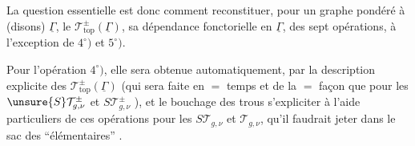 
La question essentielle est donc comment reconstituer, pour un graphe \deleted{$\unsure{\Gamma}$} pondéré à
  (disons) $\underline\Gamma$, le
 $\mathcal T_{\mathrm{top}}^\pm(\underline\Gamma)$,
  sa dépendance fonctorielle en $\underline\Gamma$,
 
des sept opérations, à l'exception de $4^\circ)$ et $5^\circ)$.

Pour l'opération $4^\circ)$, elle sera obtenue automatiquement, par la description explicite des
$\mathcal T_{\mathrm{top}}^\pm(\underline\Gamma)$
(qui sera faite en $=$ temps et de la $=$ façon que pour les $\unsure{S}\mathcal T_{g,\nu}^\pm$ et $S\mathcal T_{g,\nu}^\pm$ ),
et le bouchage des trous  s'expliciter à l'aide   particuliers de ces opérations pour les
$S\mathcal T_{g,\nu}$ et $\mathcal T_{g,\nu}$, qu'il faudrait jeter dans le sac des
  ``élémentaires'' .

\deleted{$(**)$}\quad
{}
